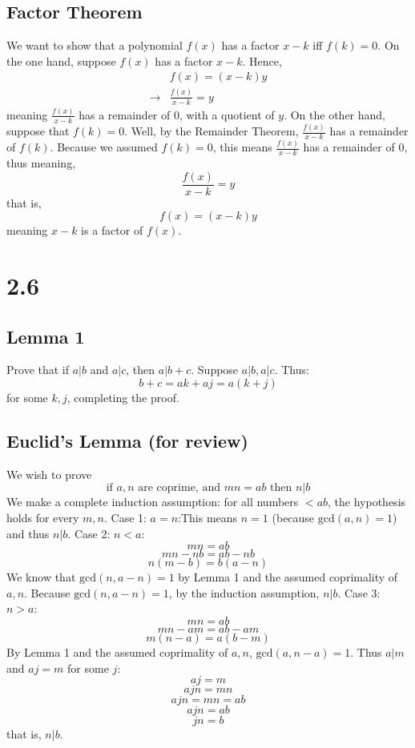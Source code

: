 \documentclass{article}
\theoremstyle{definition}
\begin{document}
\subsection*{Factor Theorem}


We want to show that a polynomial $f(x)$ has a factor $x-k$ iff $f(k)=0$. On the one hand, suppose $f(x)$ has a factor $x-k$. Hence,
\[
\begin{array}{rl}
	& f(x)=(x-k)y \\
\rightarrow & \frac{f(x)}{x-k}=y
\end{array}
\]
meaning $\frac{f(x)}{x-k}$ has a remainder of $0$, with a quotient of $y$. On the other hand, suppose that 
$f(k)=0$. Well, by the Remainder Theorem, $\frac{f(x)}{x-k}$ has a remainder of $f(k)$. Because we assumed $f(k)=0$, this means $\frac{f(x)}{x-k}$ has a 
remainder of $0$, thus meaning,
\[ \frac{f(x)}{x-k}=y \] that is, \[ f(x)=(x-k)y \] meaning $x-k$ is a factor of $f(x)$.

\section*{2.6}

\subsection*{Lemma 1}
Prove that if $a|b$ and $a|c$, then $a|b+c$.\newline
Suppose $a|b,a|c$. Thus:
\[ b+c=ak+aj=a(k+j) \] for some $k,j$, completing the proof.

\newpage
\subsection*{Euclid's Lemma (for review)}

We wish to prove
\[ \textrm{if } a,n\textrm{ are coprime, and } mn=ab\textrm{ then } n|b \]
We make a complete induction assumption: for all numbers $<ab$, the hypothesis holds for every $m,n$.\newline
Case 1: $a=n$:\newline This means $n=1$ (because $\textrm{gcd}(a,n)=1$) and thus $n|b$.\newline
Case 2: $n<a$:\newline 
\[ mn=ab \]
\[ mn-nb=ab-nb \]
\[ n(m-b)=b(a-n) \]
We know that $\textrm{gcd}(n,a-n)=1$ by Lemma 1 and the assumed coprimality of $a,n$. 
Because $\textrm{gcd}(n,a-n)=1$, by the induction assumption, $n|b$.\newline
Case 3: $n>a$:\newline
\[ mn=ab \]
\[ mn-am=ab-am \]
\[ m(n-a)=a(b-m) \]
By Lemma 1 and the assumed coprimality of $a,n$, $\textrm{gcd}(a,n-a)=1$. Thus $a|m$ and $aj=m$ for some $j$:
\[ aj=m \]
\[ ajn=mn \]
\[ ajn=mn=ab \]
\[ ajn=ab \]
\[ jn=b \]
that is, $n|b$.
\end{document}
